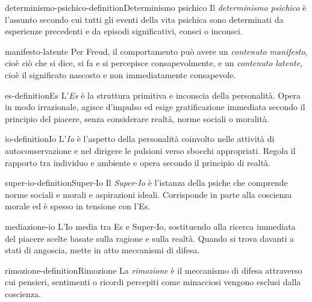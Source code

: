 \documentclass[preview]{standalone}
\begin{document}
\begin{snippetdefinition}{determinismo-psichico-definition}{Determinismo psichico}
    Il \emph{determinismo psichico} è l'assunto secondo cui tutti gli eventi
    della vita psichica sono determinati da esperienze precedenti e da episodi
    significativi, consci o inconsci.
\end{snippetdefinition}

\begin{snippet}{manifesto-latente}
    Per Freud, il comportamento può avere un \emph{contenuto manifesto}, cioè
    ciò che si dice, si fa e si percepisce consapevolmente, e un
    \emph{contenuto latente}, cioè il significato nascosto e non immediatamente
    consapevole.
\end{snippet}

\begin{snippetdefinition}{es-definition}{Es}
    L'\emph{Es} è la struttura primitiva e inconscia della personalità. Opera in
    modo irrazionale, agisce d'impulso ed esige gratificazione immediata secondo
    il principio del piacere, senza considerare realtà, norme sociali o moralità.
\end{snippetdefinition}

\begin{snippetdefinition}{io-definition}{Io}
    L'\emph{Io} è l'aspetto della personalità coinvolto nelle attività di
    autoconservazione e nel dirigere le pulsioni verso sbocchi appropriati.
    Regola il rapporto tra individuo e ambiente e opera secondo il principio di
    realtà.
\end{snippetdefinition}

\begin{snippetdefinition}{super-io-definition}{Super-Io}
    Il \emph{Super-Io} è l'istanza della psiche che comprende norme sociali e
    morali e aspirazioni ideali. Corrisponde in parte alla coscienza morale ed è
    spesso in tensione con l'Es.
\end{snippetdefinition}

\begin{snippet}{mediazione-io}
    L'Io media tra Es e Super-Io, sostituendo alla ricerca immediata del piacere
    scelte basate sulla ragione e sulla realtà. Quando si trova davanti a stati
    di angoscia, mette in atto meccanismi di difesa.
\end{snippet}

\begin{snippetdefinition}{rimozione-definition}{Rimozione}
    La \emph{rimozione} è il meccanismo di difesa attraverso cui pensieri,
    sentimenti o ricordi percepiti come minacciosi vengono esclusi dalla
    coscienza.
\end{snippetdefinition}
\end{document}
